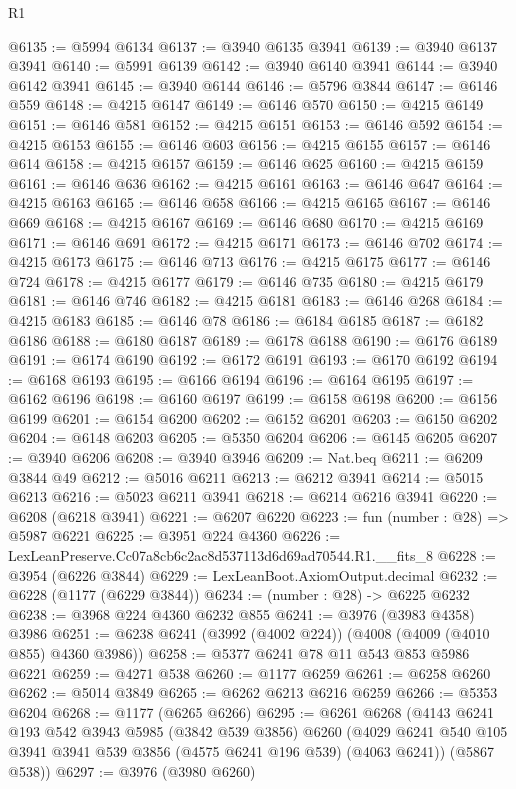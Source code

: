 \begin{lexlean}{R1}
\begin{coremodule}
@6135 := @5994 @6134
@6137 := @3940 @6135 @3941
@6139 := @3940 @6137 @3941
@6140 := @5991 @6139
@6142 := @3940 @6140 @3941
@6144 := @3940 @6142 @3941
@6145 := @3940 @6144
@6146 := @5796 @3844
@6147 := @6146 @559
@6148 := @4215 @6147
@6149 := @6146 @570
@6150 := @4215 @6149
@6151 := @6146 @581
@6152 := @4215 @6151
@6153 := @6146 @592
@6154 := @4215 @6153
@6155 := @6146 @603
@6156 := @4215 @6155
@6157 := @6146 @614
@6158 := @4215 @6157
@6159 := @6146 @625
@6160 := @4215 @6159
@6161 := @6146 @636
@6162 := @4215 @6161
@6163 := @6146 @647
@6164 := @4215 @6163
@6165 := @6146 @658
@6166 := @4215 @6165
@6167 := @6146 @669
@6168 := @4215 @6167
@6169 := @6146 @680
@6170 := @4215 @6169
@6171 := @6146 @691
@6172 := @4215 @6171
@6173 := @6146 @702
@6174 := @4215 @6173
@6175 := @6146 @713
@6176 := @4215 @6175
@6177 := @6146 @724
@6178 := @4215 @6177
@6179 := @6146 @735
@6180 := @4215 @6179
@6181 := @6146 @746
@6182 := @4215 @6181
@6183 := @6146 @268
@6184 := @4215 @6183
@6185 := @6146 @78
@6186 := @6184 @6185
@6187 := @6182 @6186
@6188 := @6180 @6187
@6189 := @6178 @6188
@6190 := @6176 @6189
@6191 := @6174 @6190
@6192 := @6172 @6191
@6193 := @6170 @6192
@6194 := @6168 @6193
@6195 := @6166 @6194
@6196 := @6164 @6195
@6197 := @6162 @6196
@6198 := @6160 @6197
@6199 := @6158 @6198
@6200 := @6156 @6199
@6201 := @6154 @6200
@6202 := @6152 @6201
@6203 := @6150 @6202
@6204 := @6148 @6203
@6205 := @5350 @6204
@6206 := @6145 @6205
@6207 := @3940 @6206
@6208 := @3940 @3946
@6209 := Nat.beq
@6211 := @6209 @3844 @49
@6212 := @5016 @6211
@6213 := @6212 @3941
@6214 := @5015 @6213
@6216 := @5023 @6211 @3941
@6218 := @6214 @6216 @3941
@6220 := @6208 (@6218 @3941)
@6221 := @6207 @6220
@6223 := fun (number : @28) => @5987 @6221
@6225 := @3951 @224 @4360
@6226 := LexLeanPreserve.Cc07a8cb6c2ac8d537113d6d69ad70544.R1.__fits_8
@6228 := @3954 (@6226 @3844)
@6229 := LexLeanBoot.AxiomOutput.decimal
@6232 := @6228 (@1177 (@6229 @3844))
@6234 := (number : @28) -> @6225 @6232
@6238 := @3968 @224 @4360 @6232 @855
@6241 := @3976 (@3983 @4358) @3986
@6251 := @6238 @6241 (@3992 (@4002 @224)) (@4008 (@4009 (@4010 @855) @4360 @3986))
@6258 := @5377 @6241 @78 @11 @543 @853 @5986 @6221
@6259 := @4271 @538
@6260 := @1177 @6259
@6261 := @6258 @6260
@6262 := @5014 @3849
@6265 := @6262 @6213 @6216 @6259
@6266 := @5353 @6204
@6268 := @1177 (@6265 @6266)
@6295 := @6261
    @6268
    (@4143
      @6241
      @193
      @542
      @3943
      @5985
      (@3842 @539 @3856)
      @6260
      (@4029 @6241 @540 @105 @3941 @3941 @539 @3856 (@4575 @6241 @196 @539) (@4063 @6241))
      (@5867 @538))
@6297 := @3976 (@3980 @6260)

\end{coremodule}
\end{lexlean}

